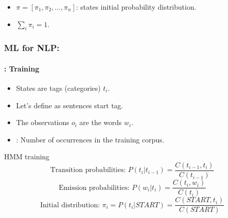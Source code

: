 \documentclass[xcolor=table]{beamer}
\begin{document}
\begin{frame}
\begin{minipage}{.45\textwidth}
		\end{minipage}
		
		\begin{itemize}
			\item $\pi = [\pi_1, \pi_2, \ldots, \pi_n ]$: states initial probability distribution.
			\item $\sum_i \pi_i = 1$.
		\end{itemize}
		
	\end{frame}
	
	\begin{frame}
		\frametitle{ML for NLP: \insertsection}
		\framesubtitle{\insertsubsection: Training}
		
		\begin{itemize}
			\item States are tags (categories) $t_i$.
			\item Let's define  as sentences start tag.
			\item The observations $o_i$ are the words $w_i$.
			\item {}: Number of occurrences in the training corpus.
		\end{itemize}
		
		\begin{block}{HMM training}
			\[
			\text{Transition probabilities: } P(t_i | t_{i-1}) = \frac{C(t_{i-1}, t_i)}{C(t_{i-1})} 
			\]\[
			\text{Emission probabilities: } P(w_i | t_i) = \frac{C(t_i, w_i)}{C(t_i)}
			\]\[
			\text{Initial distribution: } \pi_i = P(t_i | START) = \frac{C(START, t_i)}{C(START)}
			\]
		\end{block}
	\end{frame}
	
\end{document}
